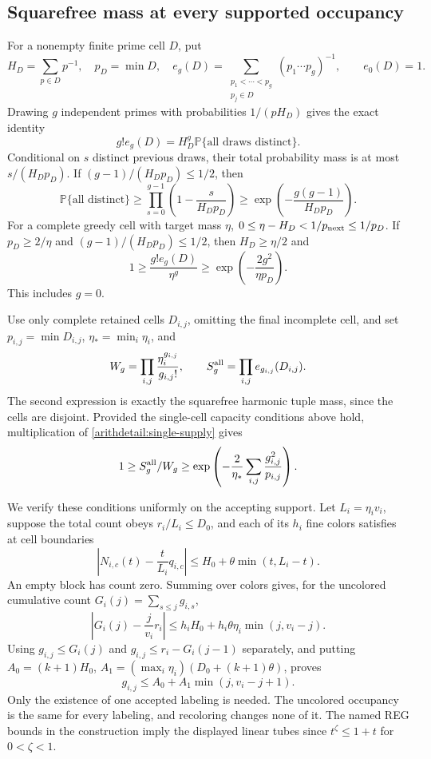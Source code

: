 \subsection{Squarefree mass at every supported occupancy}
\label{arithdetail:supply}
For a nonempty finite prime cell $D$, put
\[
 H_D=\sum_{p\in D}p^{-1},\quad p_D=\min D,\quad
 e_g(D)=\sum_{\substack{p_1<\cdots<p_g\\p_j\in D}}(p_1\cdots p_g)^{-1},
 \qquad e_0(D)=1.
\]
Drawing $g$ independent primes with probabilities $1/(pH_D)$ gives
the exact identity
\[
 g!e_g(D)=H_D^g\mathbb P\{\text{all draws distinct}\}.
\]
Conditional on $s$ distinct previous draws, their total probability
mass is at most $s/(H_Dp_D)$. If $(g-1)/(H_Dp_D)\leq1/2$, then
\[
 \mathbb P\{\text{all distinct}\}
 \geq\prod_{s=0}^{g-1}\left(1-\frac{s}{H_Dp_D}\right)
 \geq\exp\left(-\frac{g(g-1)}{H_Dp_D}\right).
\]
For a complete greedy cell with target mass $\eta$,
$0\leq\eta-H_D<1/p_{\rm next}\leq1/p_D$.
If $p_D\geq2/\eta$ and $(g-1)/(H_Dp_D)\leq1/2$, then
$H_D\geq\eta/2$ and
\begin{equation}
 1\geq\frac{g!e_g(D)}{\eta^g}
 \geq\exp\left(-\frac{2g^2}{\eta p_D}\right).
 \label{arithdetail:single-supply}
\end{equation}
This includes $g=0$.

Use only complete retained cells $D_{i,j}$, omitting the final
incomplete cell, and set $p_{i,j}=\min D_{i,j}$,
$\eta_*=\min_i\eta_i$, and
\[
 W_g=\prod_{i,j}\frac{\eta_i^{g_{i,j}}}{g_{i,j}!},\qquad
 S_g^{\rm all}=\prod_{i,j}e_{g_{i,j}}(D_{i,j}).
\]
The second expression is exactly the squarefree harmonic tuple mass,
since the cells are disjoint. Provided the single-cell capacity
conditions above hold, multiplication of
\eqref{arithdetail:single-supply} gives
\begin{equation}
 1\geq S_g^{\rm all}/W_g
 \geq\exp\left(-\frac2{\eta_*}\sum_{i,j}\frac{g_{i,j}^2}{p_{i,j}}\right).
 \label{arithdetail:product-supply}
\end{equation}

We verify these conditions uniformly on the accepting support.
Let $L_i=\eta_iv_i$, suppose the total count obeys $r_i/L_i\leq D_0$,
and each of its $h_i$ fine colors satisfies at cell boundaries
\[
 \left|N_{i,c}(t)-\frac{t}{L_i}q_{i,c}\right|
 \leq H_0+\theta\min(t,L_i-t).
\]
An empty block has count zero. Summing over colors gives, for the
uncolored cumulative count $G_i(j)=\sum_{s\leq j}g_{i,s}$,
\[
 \left|G_i(j)-\frac j{v_i}r_i\right|
 \leq h_iH_0+h_i\theta\eta_i\min(j,v_i-j).
\]
Using $g_{i,j}\leq G_i(j)$ and
$g_{i,j}\leq r_i-G_i(j-1)$ separately, and putting
$A_0=(k+1)H_0$, $A_1=(\max_i\eta_i)(D_0+(k+1)\theta)$, proves
\begin{equation}
 g_{i,j}\leq A_0+A_1\min(j,v_i-j+1).
 \label{arithdetail:two-sided-tube}
\end{equation}
Only the existence of one accepted labeling is needed. The uncolored
occupancy is the same for every labeling, and recoloring changes none
of it. The named REG bounds in the construction imply the displayed
linear tubes since $t^\zeta\leq1+t$ for $0<\zeta<1$.

